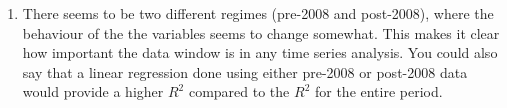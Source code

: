 \documentclass[11pt]{article}
\begin{document}
\begin{enumerate}
      \item There seems to be two different regimes (pre-2008 and post-2008), where the behaviour 
            of the the variables seems to change somewhat. This makes it clear how important the 
            data window is in any time series analysis. You could also say that a linear regression 
            done using either pre-2008 or post-2008 data would provide a higher $R^2$ compared to the 
            $R^2$ for the entire period. 
\end{enumerate}
\end{document}
